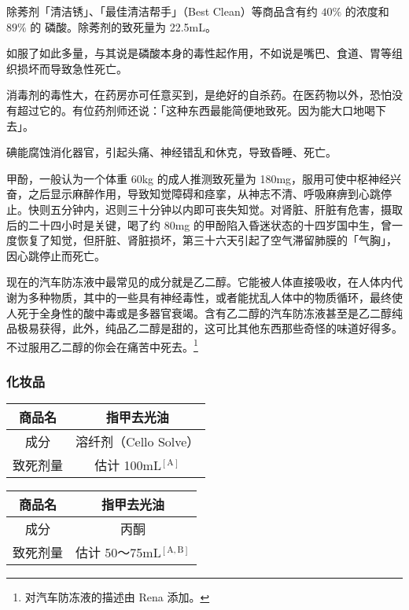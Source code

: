 \documentclass[UTF8]{ctexart}
\begin{document}
除莠剂「清洁锈」、「最佳清洁帮手」（Best Clean）等商品含有约 $40\%$ 的浓度和 $89\%$ 的
磷酸。除莠剂的致死量为 22.5mL。

如服了如此多量，与其说是磷酸本身的毒性起作用，不如说是嘴巴、食道、胃等组织损坏而导致急性死亡。

消毒剂的毒性大，在药房亦可任意买到，是绝好的自杀药。在医药物以外，恐怕没有超过它的。有位药剂师还说：「这种东西最能简便地致死。因为能大口地喝下去」。

碘能腐蚀消化器官，引起头痛、神经错乱和休克，导致昏睡、死亡。

甲酚，一般认为一个体重 60kg 的成人推测致死量为 180mg，服用可使中枢神经兴奋，之后显示麻醉作用，导致知觉障碍和痉挛，从神志不清、呼吸麻痹到心跳停止。快则五分钟内，迟则三十分钟以内即可丧失知觉。对肾脏、肝脏有危害，摄取后的二十四小时是关键，喝了约 80mg 的甲酚陷入昏迷状态的十四岁国中生，曾一度恢复了知觉，但肝脏、肾脏损坏，第三十六天引起了空气滞留肺膜的「气胸」，因心跳停止而死亡。

现在的汽车防冻液中最常见的成分就是乙二醇。它能被人体直接吸收，在人体内代谢为多种物质，其中的一些具有神经毒性，或者能扰乱人体中的物质循环，最终使人死于全身性的酸中毒或是多器官衰竭。含有乙二醇的汽车防冻液甚至是乙二醇纯品极易获得，此外，纯品乙二醇是甜的，这可比其他东西那些奇怪的味道好得多。不过服用乙二醇的你会在痛苦中死去。\footnote{对汽车防冻液的描述由 Rena 添加。}

\subsubsection*{化妆品}

\begin{table}[htbp]
\begin{center}
\begin{tabular}{cc}

\toprule
商品名 & 指甲去光油 \\
\midrule
成分 & 溶纤剂（Cello Solve） \\
致死剂量 & 估计 100mL$^\mathrm{[A]}$ \\
\bottomrule
\end{tabular}
\end{center}
\end{table}



\begin{table}[htbp]
\begin{center}
\begin{tabular}{cc}

\toprule
商品名 & 指甲去光油 \\
\midrule
成分 & 丙酮 \\
致死剂量 & 估计 50～75mL$^\mathrm{[A,B]}$ \\
\bottomrule
\end{tabular}
\end{center}
\end{table}
\end{document}

